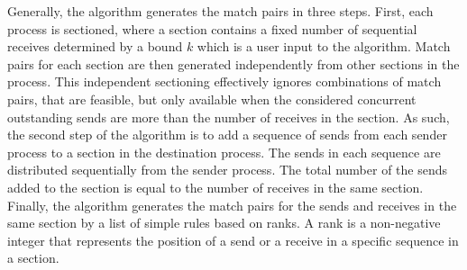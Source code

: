 Generally, the algorithm generates the match pairs in three steps. First, each process is sectioned, where a section contains a fixed number of sequential receives determined by a bound $k$ which is a user input to the algorithm. 
Match pairs for each section are then generated independently from other sections in the process. This independent sectioning effectively ignores combinations of match pairs, that are feasible, but only available when the considered concurrent outstanding sends are more than the number of receives in the section. As such, the second step of the algorithm is to add a sequence of sends from each sender process to a section in the destination process. The sends in each sequence are distributed sequentially from the sender process. The total number of the sends added to the section is equal to the number of receives in the same section. Finally, the algorithm generates the match pairs for the sends and receives in the same section by a list of simple rules based on ranks. A rank is a non-negative integer that represents the position of a send or a receive in a specific sequence in a section.




